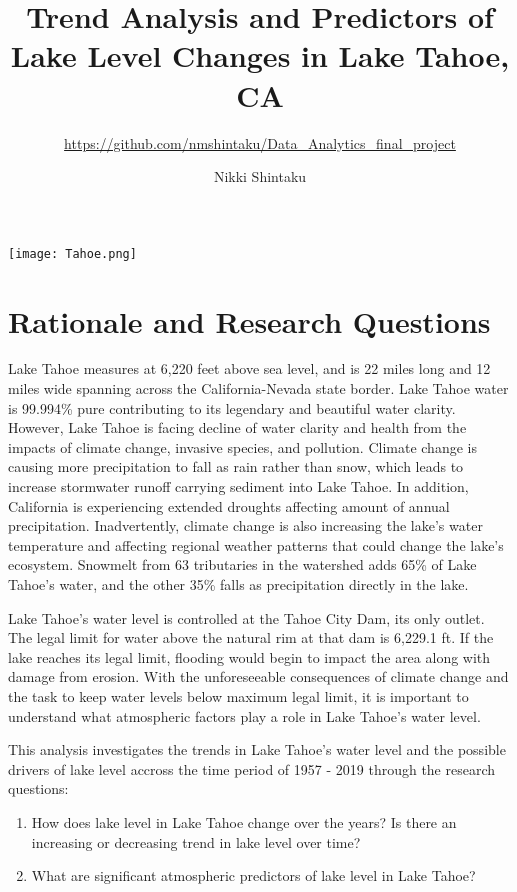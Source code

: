 \documentclass[12pt,]{article}
\title{Trend Analysis and Predictors of Lake Level Changes in Lake Tahoe, CA}
\subtitle{\url{https://github.com/nmshintaku/Data_Analytics_final_project}}
\author{Nikki Shintaku}
\date{}
\let\origfigure\figure
\let\endorigfigure\endfigure
\renewenvironment{figure}[1][2] {
    \expandafter\origfigure\expandafter[H]
} {
    \endorigfigure
}
\begin{document}
\maketitle

\begin{figure}
\centering
\texttt{[image: Tahoe.png]}
\caption{Lake Tahoe, CA}
\end{figure}

\newpage
\tableofcontents 
\newpage
\listoftables 
\newpage
\listoffigures 
\newpage

\hypertarget{rationale-and-research-questions}{%
\section{Rationale and Research
Questions}\label{rationale-and-research-questions}}

Lake Tahoe measures at 6,220 feet above sea level, and is 22 miles long
and 12 miles wide spanning across the California-Nevada state border.
Lake Tahoe water is 99.994\% pure contributing to its legendary and
beautiful water clarity. However, Lake Tahoe is facing decline of water
clarity and health from the impacts of climate change, invasive species,
and pollution. Climate change is causing more precipitation to fall as
rain rather than snow, which leads to increase stormwater runoff
carrying sediment into Lake Tahoe. In addition, California is
experiencing extended droughts affecting amount of annual precipitation.
Inadvertently, climate change is also increasing the lake's water
temperature and affecting regional weather patterns that could change
the lake's ecosystem. Snowmelt from 63 tributaries in the watershed adds
65\% of Lake Tahoe's water, and the other 35\% falls as precipitation
directly in the lake.

Lake Tahoe's water level is controlled at the Tahoe City Dam, its only
outlet. The legal limit for water above the natural rim at that dam is
6,229.1 ft. If the lake reaches its legal limit, flooding would begin to
impact the area along with damage from erosion. With the unforeseeable
consequences of climate change and the task to keep water levels below
maximum legal limit, it is important to understand what atmospheric
factors play a role in Lake Tahoe's water level.

This analysis investigates the trends in Lake Tahoe's water level and
the possible drivers of lake level accross the time period of 1957 -
2019 through the research questions:

\begin{enumerate}
\def\labelenumi{\arabic{enumi}.}
\item
  How does lake level in Lake Tahoe change over the years? Is there an
  increasing or decreasing trend in lake level over time?
\item
  What are significant atmospheric predictors of lake level in Lake
  Tahoe?
\end{enumerate}
\end{document}

